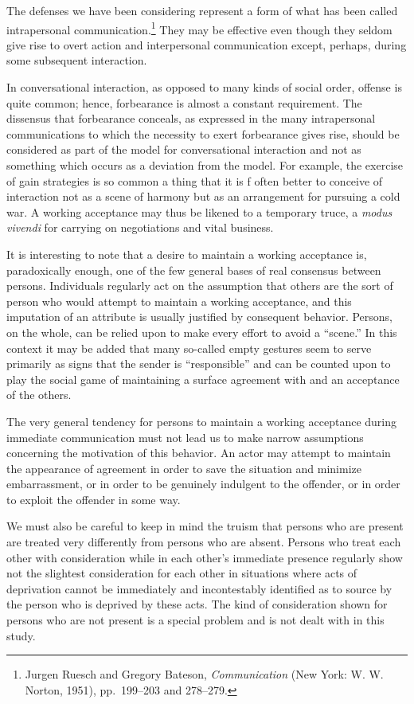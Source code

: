 \documentclass[openany,nobib]{tufte-book}
\begin{document}
The defenses we have been considering represent a form of what has been
called intrapersonal communication.\footnote{Jurgen Ruesch and Gregory
  Bateson, \emph{Communication} (New York: W. W. Norton, 1951),
  pp.~199--203 and 278--279.} They may be effective even though they
seldom give rise to overt action and interpersonal communication except,
perhaps, during some subsequent interaction.

In conversational interaction, as opposed to many kinds of social order,
offense is quite common; hence, forbearance is almost a constant
requirement. The dissensus that forbearance conceals, as expressed in
the many intrapersonal communications to which the necessity to exert
forbearance gives rise, should be considered as part of the model for
conversational interaction and not as something which occurs as a
deviation from the model. For example, the exercise of gain strategies
is so common a thing that it is f often better to conceive of
interaction not as a scene of harmony but as an arrangement for pursuing
a cold war. A working acceptance may thus be likened to a temporary
truce, a \emph{modus vivendi} for carrying on negotiations and vital
business.

It is interesting to note that a desire to maintain a working acceptance
is, paradoxically enough, one of the few general bases of real consensus
between persons. Individuals regularly act on the assumption that others
are the sort of person who would attempt to maintain a working
acceptance, and this imputation of an attribute is usually justified by
consequent behavior. Persons, on the whole, can be relied upon to make
every effort to avoid a ``scene.'' In this context it may be added that
many so-called empty gestures seem to serve primarily as signs that the
sender is ``responsible'' and can be counted upon to play the social
game of maintaining a surface agreement with and an acceptance of the
others.

The very general tendency for persons to maintain a working acceptance
during immediate communication must not lead us to make narrow
assumptions concerning the motivation of this behavior. An actor may
attempt to maintain the appearance of agreement in order to save the
situation and minimize embarrassment, or in order to be genuinely
indulgent to the offender, or in order to exploit the offender in some
way.

We must also be careful to keep in mind the truism that persons who are
present are treated very differently from persons who are absent.
Persons who treat each other with consideration while in each other's
immediate presence regularly show not the slightest consideration for
each other in situations where acts of deprivation cannot be immediately
and incontestably identified as to source by the person who is deprived
by these acts. The kind of consideration shown for persons who are not
present is a special problem and is not dealt with in this study.
\end{document}
